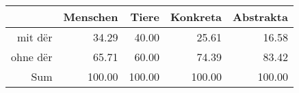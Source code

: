 \begin{tabular}{rrrrr}
  \hline
 & Menschen & Tiere & Konkreta & Abstrakta \\ 
  \hline
mit dër & 34.29 & 40.00 & 25.61 & 16.58 \\ 
  ohne dër & 65.71 & 60.00 & 74.39 & 83.42 \\ 
  Sum & 100.00 & 100.00 & 100.00 & 100.00 \\ 
   \hline
\end{tabular}
